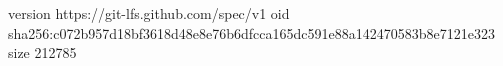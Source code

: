 version https://git-lfs.github.com/spec/v1
oid sha256:c072b957d18bf3618d48e8e76b6dfcca165dc591e88a142470583b8e7121e323
size 212785
